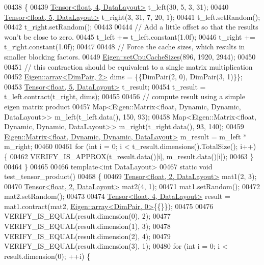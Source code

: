 \begin{DoxyCode}
00438 \{
00439   \hyperlink{class_eigen_1_1_tensor}{Tensor<float, 4, DataLayout>} t\_left(30, 5, 3, 31);
00440   \hyperlink{class_eigen_1_1_tensor}{Tensor<float, 5, DataLayout>} t\_right(3, 31, 7, 20, 1);
00441   t\_left.setRandom();
00442   t\_right.setRandom();
00443 
00444   \textcolor{comment}{// Add a little offset so that the results won't be close to zero.}
00445   t\_left += t\_left.constant(1.0f);
00446   t\_right += t\_right.constant(1.0f);
00447 
00448   \textcolor{comment}{// Force the cache sizes, which results in smaller blocking factors.}
00449   \hyperlink{namespace_eigen_ae64421554aa0a4bf9258bafe3170102b}{Eigen::setCpuCacheSizes}(896, 1920, 2944);
00450 
00451   \textcolor{comment}{// this contraction should be equivalent to a single matrix multiplication}
00452   \hyperlink{class_eigen_1_1array}{Eigen::array<DimPair, 2>} dims = \{\{DimPair(2, 0), DimPair(3, 1)\}\};
00453   \hyperlink{class_eigen_1_1_tensor}{Tensor<float, 5, DataLayout>} t\_result;
00454   t\_result = t\_left.contract(t\_right, dims);
00455 
00456   \textcolor{comment}{// compute result using a simple eigen matrix product}
00457   Map<Eigen::Matrix<float, Dynamic, Dynamic, DataLayout>> m\_left(t\_left.data(), 150, 93);
00458   Map<Eigen::Matrix<float, Dynamic, Dynamic, DataLayout>> m\_right(t\_right.data(), 93, 140);
00459   \hyperlink{group___core___module_class_eigen_1_1_matrix}{Eigen::Matrix<float, Dynamic, Dynamic, DataLayout>} 
      m\_result = m\_left * m\_right;
00460 
00461   \textcolor{keywordflow}{for} (\textcolor{keywordtype}{int} i = 0; i < t\_result.dimensions().TotalSize(); i++) \{
00462     VERIFY\_IS\_APPROX(t\_result.data()[i], m\_result.data()[i]);
00463   \}
00464 \}
00465 
00466 \textcolor{keyword}{template}<\textcolor{keywordtype}{int} DataLayout>
00467 \textcolor{keyword}{static} \textcolor{keywordtype}{void} test\_tensor\_product()
00468 \{
00469   \hyperlink{class_eigen_1_1_tensor}{Tensor<float, 2, DataLayout>} mat1(2, 3);
00470   \hyperlink{class_eigen_1_1_tensor}{Tensor<float, 2, DataLayout>} mat2(4, 1);
00471   mat1.setRandom();
00472   mat2.setRandom();
00473 
00474   \hyperlink{class_eigen_1_1_tensor}{Tensor<float, 4, DataLayout>} result = mat1.contract(mat2, 
      \hyperlink{class_eigen_1_1array}{Eigen::array<DimPair, 0>}\{\{\}\});
00475 
00476   VERIFY\_IS\_EQUAL(result.dimension(0), 2);
00477   VERIFY\_IS\_EQUAL(result.dimension(1), 3);
00478   VERIFY\_IS\_EQUAL(result.dimension(2), 4);
00479   VERIFY\_IS\_EQUAL(result.dimension(3), 1);
00480   \textcolor{keywordflow}{for} (\textcolor{keywordtype}{int} i = 0; i < result.dimension(0); ++i) \{

\end{DoxyCode}
